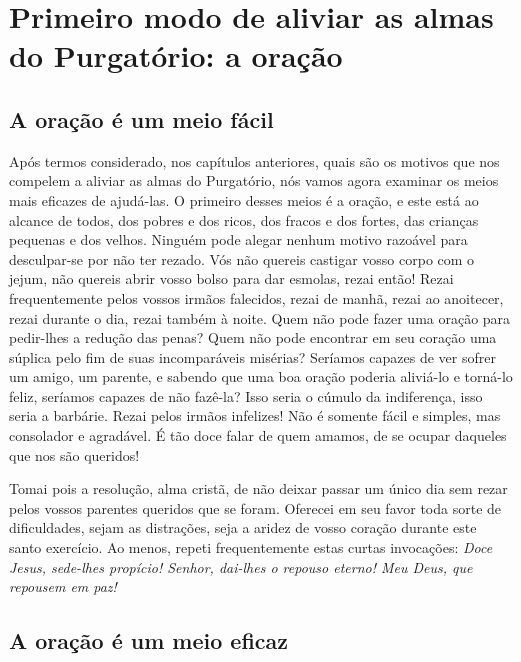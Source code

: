 \renewcommand{\thechapterdisplay}{Vigésimo dia}
\renewcommand{\thechapterrunner}{Primeiro modo de aliviar as almas do Purgatório: a oração}
\chapter[Vigésimo dia --- Primeiro modo de aliviar as almas do Purgatório: a oração]{Primeiro modo de aliviar as almas do Purgatório: a oração}
\section*{A oração é um meio fácil}

Após termos considerado, nos capítulos anteriores, quais são os motivos que nos compelem a aliviar as almas do Purgatório, nós vamos agora examinar os meios mais eficazes de ajudá-las. O primeiro desses meios é a oração, e este está ao alcance de todos, dos pobres e dos ricos, dos fracos e dos fortes, das crianças pequenas e dos velhos. Ninguém pode alegar nenhum motivo razoável para desculpar-se por não ter rezado. Vós não quereis castigar vosso corpo com o jejum, não quereis abrir vosso bolso para dar esmolas, rezai então! Rezai frequentemente pelos vossos irmãos falecidos, rezai de manhã, rezai ao anoitecer, rezai durante o dia, rezai também à noite. Quem não pode fazer uma oração para pedir-lhes a redução das penas? Quem não pode encontrar em seu coração uma súplica pelo fim de suas incomparáveis misérias? Seríamos capazes de ver sofrer um amigo, um parente, e sabendo que uma boa oração poderia aliviá-lo e torná-lo feliz, seríamos capazes de não fazê-la? Isso seria o cúmulo da indiferença, isso seria a barbárie. Rezai pelos irmãos infelizes! Não é somente fácil e simples, mas consolador e agradável. É tão doce falar de quem amamos, de se ocupar daqueles que nos são queridos!

Tomai pois a resolução, alma cristã, de não deixar passar um único dia sem rezar pelos vossos parentes queridos que se foram. Oferecei em seu favor toda sorte de dificuldades, sejam as distrações, seja a aridez de vosso coração durante este santo exercício. Ao menos, repeti frequentemente estas curtas invocações: \textit{Doce Jesus, sede-lhes propício! Senhor, dai-lhes o repouso eterno! Meu Deus, que repousem em paz!}


\section*{A oração é um meio eficaz}

